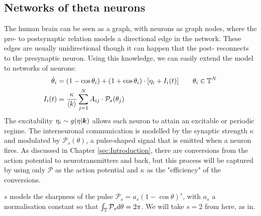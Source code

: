 


\subsection{Networks of theta neurons}
The human brain can be seen as a graph, with neurons as graph nodes, where the pre- to postsynaptic relation models a directional edge in the network. These edges are usually unidirectional though it can happen that the post- reconnects to the presynaptic neuron. Using this knowledge, we can easily extend the model to networks of neurons:
\begin{align}
\dot{\theta}_{i} &=\left(1-\cos \theta_{i}\right)+\left(1+\cos \theta_{i}\right) \cdot \left[\eta_{i} + I_{i}(t)\right] \qquad \theta_i \in \T^N  \label{eq:thetaneuronnetwork} \\
I_{i}(t) &=\frac{\kappa}{\kmean} \sum_{j=1}^{N} A_{i j} \cdot \mathcal{P}_{s}(\theta_{j}) \label{eq:thetaneuronnetworkcurrent}
\end{align}
The excitability $\eta_i \sim g(\eta \rvert {\boldsymbol{k}})$ allows each neuron to attain an excitable or periodic regime. The interneuronal communication is modelled by the synaptic strength $\kappa$ and modulated by $\mathcal{P}_s(\theta)$, a pulse-shaped signal that is emitted when a neuron fires. As discussed in Chapter \ref{sec:Introduction}, there are conversions from the action potential to neurotransmitters and back, but this process will be captured by using only $\mathcal{P}$ as the action potential and $\kappa$ as the "efficiency" of the conversions. 

$s$ models the sharpness of the pulse $\mathcal{P}_s = a_s(1 - \cos \theta)^s$, with $a_s$ a normalisation constant so that $\int_{{\mathbb{T}}} \mathcal{P}_{s} d \theta=2 \pi$. We will take $s=2$ from here, as in\cite{Luke2013, OttAntonsen2017, Martens2020}. 

